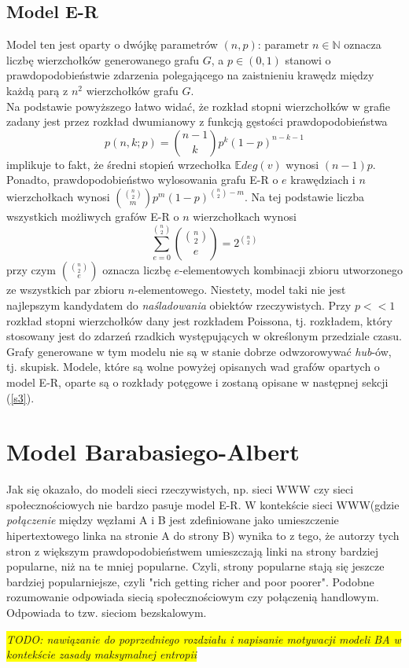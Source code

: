 \documentclass{article}
\newcommand{\todo}[1]{
	\colorbox{yellow} {{\color{red}
	\emph {TODO: #1}
}}}
\begin{document}
\subsection{Model E-R}
	Model ten jest oparty o dwójkę parametrów $(n, p)$: parametr $n \in \mathbb{N}$ oznacza liczbę wierzchołków generowanego grafu $G$, a $p \in
	(0, 1)$ stanowi o prawdopodobieństwie zdarzenia polegającego na zaistnieniu krawędz między każdą parą z $n^2$ wierzchołków grafu $G$. \\
	Na podstawie powyższego łatwo widać, że rozkład stopni wierzchołków w grafie zadany jest przez rozkład dwumianowy z funkcją
	gęstości prawdopodobieństwa 
	\begin{equation}
		p(n,k; p) = \binom{n-1}{k}p^{k}(1-p)^{n-k - 1}
	\end{equation}
	implikuje to fakt, że średni stopień wrzechołka $\mathbb{E}deg(v)$ wynosi $(n-1)p$. Ponadto, prawdopodobieństwo wylosowania grafu E-R o $e$ krawędziach i $n$ wierzchołkach wynosi
	$\binom{\binom{n}{2}}{m}p^{m}(1-p)^{\binom{n}{2} - m}$. Na tej podstawie liczba wszystkich możliwych grafów E-R o $n$ wierzchołkach wynosi
	\begin{equation}
		\sum_{e = 0}^{\binom{n}{2}} \binom{\binom{n}{2}}{e} = 2^{\binom{n}{2}}
	\end{equation}
	przy czym $\binom{\binom{n}{2}}{e}$ oznacza liczbę $e$-elementowych kombinacji zbioru utworzonego ze wszystkich par zbioru $n$-elementowego. \newline
	Niestety, model taki nie jest najlepszym kandydatem do \textit{naśladowania} obiektów rzeczywistych. Przy $p << 1$ rozkład stopni wierzchołków dany jest rozkładem Poissona, tj. rozkładem, który stosowany jest do zdarzeń rzadkich występujących w określonym przedziale czasu. Grafy generowane w tym modelu nie są w stanie dobrze odwzorowywać \textit{hub}-ów, tj. skupisk. \newline
	Modele, które są wolne powyżej opisanych wad grafów opartych o model E-R, oparte są o rozkłady potęgowe i zostaną opisane w następnej sekcji (\ref{s3}).
\section{Model Barabasiego-Albert \label{s3}}
	Jak się okazało, do modeli sieci rzeczywistych, np. sieci WWW czy sieci społecznościowych nie bardzo pasuje model E-R. W kontekście sieci WWW(gdzie \textit{połączenie} między węzłami A i B jest zdefiniowane jako umieszczenie hipertextowego linka na stronie A do strony B) wynika to z tego, że autorzy tych stron z większym prawdopodobieństwem umieszczają linki na strony bardziej popularne, niż na te mniej popularne. Czyli, strony popularne stają się jeszcze bardziej popularniejsze, czyli "rich getting richer and poor poorer". Podobne rozumowanie odpowiada siecią społecznościowym czy połączenią handlowym. Odpowiada to tzw. sieciom bezskalowym.\cite{Fronczak2}
	\todo{nawiązanie do poprzedniego rozdziału i napisanie motywacji modeli BA w kontekście zasady maksymalnej entropii}
\end{document}
